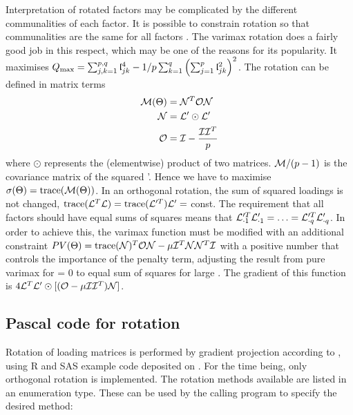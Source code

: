 Interpretation of rotated factors may be complicated by the different communalities of each factor. It is possible to constrain rotation so that communalities are the same for all factors \parencite{Tre}. The varimax rotation does a fairly good job in this respect, which may be one of the reasons for its popularity. It maximises \( Q_\mathrm{max}  = \sum_{j,k = 1}^{p, q}{\mathfrak{l}_{jk}^4} - 1/p \sum_{k=1}^q{\left(\sum_{j=1}^p{\mathfrak{l}_{jk}^2}\right)^2} \). The rotation can be defined in matrix terms
\begin{align}
  \nonumber
  \mathcal{M}(\Theta) &= \mathcal{N}^T \mathcal{O} \mathcal{N} \\
  \nonumber
  \mathcal{N} &= \mathcal{L}' \odot \mathcal{L}'\\
  \mathcal{O} &= \mathcal{I} - \frac{\mathcal{I}\mathcal{I}^T}{p}
\end{align}
where \(\odot \) represents the  (elementwise) product of two matrices. \( \mathcal{M}/(p-1) \) is the covariance matrix of the squared '. Hence we have to maximise \( \sigma(\Theta) = \mathrm{trace}(\mathcal{M}(\Theta)) \).
In an orthogonal rotation, the sum of squared loadings is not changed, \( \mathrm{trace}(\mathcal{L}^T \mathcal{L}) = \mathrm{trace}(\mathcal{L}'^T) \mathcal{L}' =\) const. The requirement that all factors should have equal sums of squares means that \( \mathcal{L}'^T_{\cdot 1} \mathcal{L}'_{\cdot 1} = \ldots = \mathcal{L}'^T_{\cdot q} \mathcal{L}'_{\cdot q} \). In order to achieve this, the varimax function must be modified with an additional constraint \( PV(\Theta) = \mathrm{trace}(\mathcal{N})^T \mathcal{O} \mathcal{N} - \mu \mathcal{I}^T \mathcal{N} \mathcal{N}^T \mathcal{I} \) with \skalar{\mu} a  positive number that controls the importance of the penalty term, adjusting the result from pure varimax for \skalar{\mu} = 0  to equal sum of squares for large \skalar{\mu}. The gradient of this function is \( 4 \mathcal{L}^T {\mathcal{L}' \odot [(\mathcal{O} - \mu \mathcal{I} \mathcal{I}^T) \mathcal{N}]} \).

\subsection{Pascal code for rotation}

Rotation of loading matrices is performed by gradient projection according to \parencite{Ber-05}, using  R and SAS example code deposited on \parencite{Ber-05a}. For the time being, only orthogonal rotation is implemented. The rotation methods available are listed in an enumeration type. These can be used by the calling program to specify the desired method:

